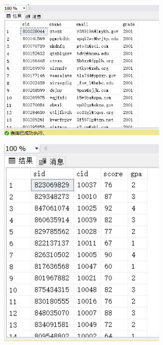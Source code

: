 \documentclass[a4paper,twoside]{article}
\begin{document}
\begin{spacing}{1.2}
\begin{enumerate}
\begin{figure}[h]
\centering
\caption{运行结果}
\begin{subfigure}{0.3\textwidth}
  \includegraphics[width=0.9\textwidth]{fig1.png}
\end{subfigure}
\begin{subfigure}{0.3\textwidth}
  \includegraphics[width=0.9\textwidth]{fig2.png}
\end{subfigure}
\end{figure}


\end{enumerate}
\end{spacing}
\end{document}
